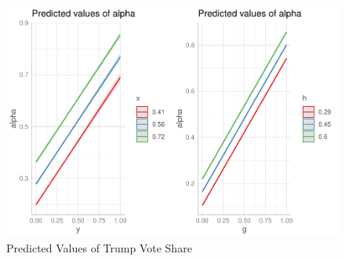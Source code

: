 \documentclass[10pt]{article}
\begin{document}
\begin{figure}
\centering
\includegraphics{CodeAppendix_files/figure-latex/figz2-1.pdf}
\caption{\label{fig:figz2}Predicted Values of Trump Vote Share}
\end{figure}
\end{document}
